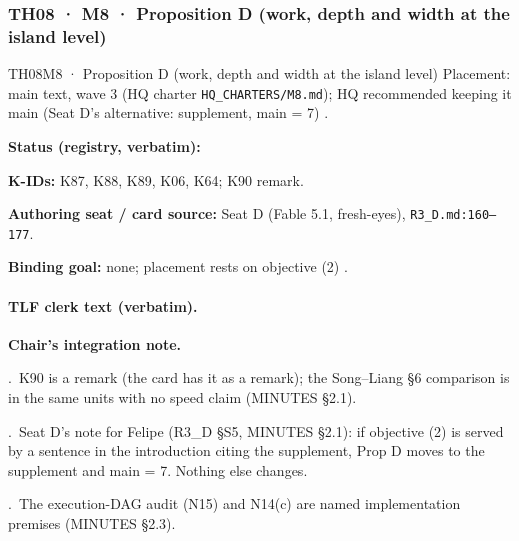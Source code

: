 \subsubsection{TH08 · M8 · Proposition D (work, depth and width at the island level)}\label{sec:th08}
\begin{card}{TH08}{M8 · Proposition D (work, depth and width at the island level)}
\approvedFB\quad Placement: main text, wave 3 (HQ charter \texttt{HQ\_CHARTERS/M8.md}); HQ recommended keeping it main (Seat D's alternative: supplement, main = 7) .\par
\textbf{Status (registry, verbatim):} \par
\textbf{K-IDs:} K87, K88, K89, K06, K64; K90 remark.\par
\textbf{Authoring seat / card source:} Seat D (Fable 5.1, fresh-eyes), \texttt{R3\_D.md:160–177}.\par
\textbf{Binding goal:} none; placement rests on objective (2) .
\end{card}

\paragraph{TLF clerk text (verbatim).}
\par\noindent \textbf{Chair's integration note.}
\par{}.~K90 is a remark (the card has it as a remark); the Song–Liang §6 comparison is in the same units with no speed claim (MINUTES §2.1).
\par{}.~Seat D's note for Felipe (R3\_D §S5, MINUTES §2.1): if objective (2) is served by a sentence in the introduction citing the supplement, Prop D moves to the supplement and main = 7. Nothing else changes.
\par{}.~The execution-DAG audit (N15) and N14(c) are named implementation premises (MINUTES §2.3).

